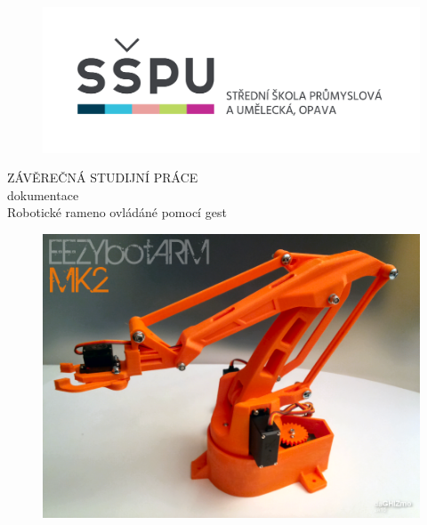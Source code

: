 \documentclass[12pt, a4paper,
twoside,        %
openright
]{report}
\title{\nazevPrace} %
\author{\jmenoAutora} %
\date{\datumOdevzdani} %
\newcommand\nazevPrace{Robotické rameno ovládáné pomocí gest} %
\begin{document}
	
	\pagestyle{empty}
	
	\cleardoublepage


	{\selectfont
	\begin{figure}[h]
		\centering
		\includegraphics[width=0.45\linewidth]{image/logo-skoly.png} 
		
	
		
	\end{figure}

	
	{\selectfont
 
		
		{\bfseries %
			\begin{center}
				\vspace{0.025 \textheight}
				\LARGE{ZÁVĚREČNÁ STUDIJNÍ PRÁCE}\\
				\large{dokumentace}\\
				\vspace{0.075 \textheight}
				\LARGE {\nazevPrace}\\
			\end{center}  
		}%
		
		\begin{figure}[h]
			\centering
			\includegraphics[width=0.8\linewidth]{image/rameno.png} 
			
		\end{figure}
		
}}
\end{document}
